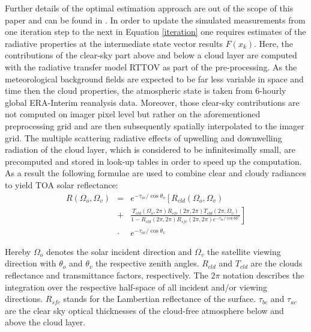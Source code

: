 \documentclass[amt]{style/copernicus}
\begin{document}
 Further details of the optimal estimation approach are out of the scope of this paper and can be found in \citet{Rodgers09}. In order to update the simulated measurements from one iteration step to the next in Equation \ref{iteration} one requires estimates of the radiative properties at the intermediate state vector results $F(x_k)$. Here, the contributions of the clear-sky part above and below a cloud layer are computed with the radiative transfer model RTTOV as part of the pre-processing. As the meteorological background fields are expected to be far less variable in space and time then the cloud properties, the atmospheric state is taken from 6-hourly global ERA-Interim reanalysis data. Moreover, those clear-sky contributions are not computed on imager pixel level but rather on the aforementioned preprocessing grid and are then subsequently spatially interpolated to the imager grid. The multiple scattering radiative effects of upwelling and downwelling radiation of the cloud layer, which is considered to be infinitesimally small, are precomputed and stored in look-up tables in order to speed up the computation. As a result the following formulae are used to combine clear and cloudy radiances to yield TOA solar reflectance:
\begin{eqnarray}
R(\Omega_o,\Omega_v) & = & e^{-\tau_{ac}/\cos \theta_o}\left [ R_{cld}(\Omega_o,\Omega_v)\right . \\\nonumber
 & + &  \left . \frac{T_{cld}(\Omega_o,2\pi)R_{sfc}(2\pi,2\pi)T_{cld}(2\pi,\Omega_v)}{1-R_{cld}(2\pi,2\pi)R_{sfc}(2\pi,2\pi)e^{-\tau_{bc}/\cos 66^o}}  \right ]\\\nonumber
 & \cdot & e^{-\tau_{ac}/\cos \theta_v}
\end{eqnarray}

Hereby $\Omega_o$ denotes the solar incident direction and $\Omega_v$ the satellite viewing direction with $\theta_o$ and $\theta_v$ the respective zenith angles. $R_{cld}$ and $T_{cld}$ are the clouds reflectance and transmittance factors, respectively. The $2\pi$ notation describes the integration over the respective half-space of all incident and/or viewing directions. $R_{sfc}$ stands for the Lambertian reflectance of the surface. $\tau_{bc}$ and $\tau_{ac}$ are the clear sky optical thicknesses of the cloud-free atmosphere below and above the cloud layer.
\end{document}
